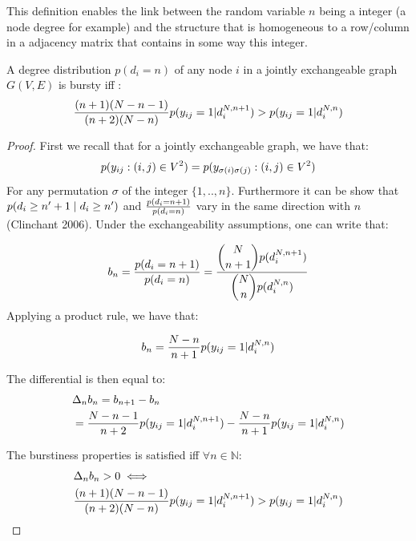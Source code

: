 This definition enables the link between the random variable $n$ being a integer (a node degree for example) and the structure that is homogeneous to a row/column in a adjacency matrix that contains in some way this integer.

\begin{theorem} \label{th:burst_exch}
	 A degree distribution $p(d_i=n)$ of any node $i$ in a jointly exchangeable graph $G(V,E)$ is bursty iff :
	\begin{equation}
	 \frac{(n+1)(N-n-1)}{(n+2)(N-n)}p(y_{ij}=1 | d_i^{N,n+1})  > p(y_{ij}=1 | d_i^{N,n})
	\end{equation}

\end{theorem}

\begin{proof}
	First we recall that for a jointly exchangeable graph, we have that:
	\begin{equation*}
	p(y_{ij}: (i,j) \in V^2) = p(y_{\sigma(i)\sigma(j)}: (i,j) \in V^2)
	\end{equation*}
	For any permutation $\sigma$ of the integer $\{1,..,n\}$. Furthermore it can be show that $ p(d_i \geq n'+1 \mid d_i \geq n')$ and $\frac{p(d_i=n+1)}{p(d_i=n)}$ vary in the same direction with $n$ (Clinchant 2006). Under the exchangeability assumptions, one can write that:
	
	\begin{align*}
	 b_n=\frac{p(d_i=n+1)}{p(d_i=n)} = \frac{\dbinom{N}{n+1} p(d_i^{N,n+1})}{\dbinom{N}{n} p(d_i^{N,n})}
	\end{align*}
 Applying a product rule, we have that:
	
	\begin{equation*}
	b_n = \frac{N-n}{n+1} p(y_{ij}=1 | d_i^{N,n})
	\end{equation*}
	
	The differential is then equal to:
	\begin{align*}
	&\Delta_n b_n= b_{n+1} - b_n  \\
	&= \frac{N-n-1}{n+2} p(y_{ij}=1 | d_i^{N,n+1}) - \frac{N-n}{n+1} p(y_{ij}=1 | d_i^{N,n})
	\end{align*}
	
	The burstiness properties is satisfied iff $\forall n \in \mathbb{N}$:
	\begin{align*}
	&\Delta_nb_n > 0 \iff \\
	& \frac{(n+1)(N-n-1)}{(n+2)(N-n)}p(y_{ij}=1 | d_i^{N,n+1})  > p(y_{ij}=1 | d_i^{N,n})
	\end{align*}
	

\end{proof}
